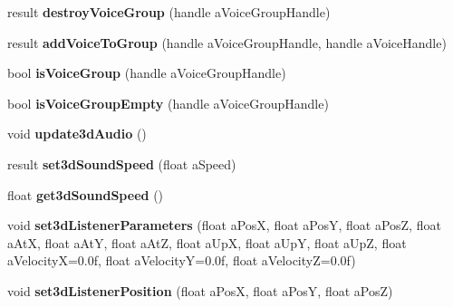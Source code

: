 \begin{DoxyCompactItemize}
\item 
\mbox{\label{class_so_loud_1_1_soloud_aae50bbfa2f6bd1e598ef6b5b15636e9c}} 
result {\bfseries destroy\+Voice\+Group} (handle a\+Voice\+Group\+Handle)
\item 
\mbox{\label{class_so_loud_1_1_soloud_a9db61d9832918e34b27fc8f07e03181a}} 
result {\bfseries add\+Voice\+To\+Group} (handle a\+Voice\+Group\+Handle, handle a\+Voice\+Handle)
\item 
\mbox{\label{class_so_loud_1_1_soloud_a7e0cce56db2108f4401244a7f7b4b209}} 
bool {\bfseries is\+Voice\+Group} (handle a\+Voice\+Group\+Handle)
\item 
\mbox{\label{class_so_loud_1_1_soloud_af7805b0b20fc49629a9e45eda96ae445}} 
bool {\bfseries is\+Voice\+Group\+Empty} (handle a\+Voice\+Group\+Handle)
\item 
\mbox{\label{class_so_loud_1_1_soloud_a21eb58ebde3955245ac69e3aa5b5f145}} 
void {\bfseries update3d\+Audio} ()
\item 
\mbox{\label{class_so_loud_1_1_soloud_a0e819643ca149ca31718322cdde5bf00}} 
result {\bfseries set3d\+Sound\+Speed} (float a\+Speed)
\item 
\mbox{\label{class_so_loud_1_1_soloud_a49769664474746f5eada52300e46f2b8}} 
float {\bfseries get3d\+Sound\+Speed} ()
\item 
\mbox{\label{class_so_loud_1_1_soloud_a3f2bfc85ad456ba9987fdb6d2ea6497b}} 
void {\bfseries set3d\+Listener\+Parameters} (float a\+PosX, float a\+PosY, float a\+PosZ, float a\+AtX, float a\+AtY, float a\+AtZ, float a\+UpX, float a\+UpY, float a\+UpZ, float a\+VelocityX=0.\+0f, float a\+Velocity\+Y=0.\+0f, float a\+Velocity\+Z=0.\+0f)
\item 
\mbox{\label{class_so_loud_1_1_soloud_a2a26c92f8ba7b283da730d038ca07ab5}} 
void {\bfseries set3d\+Listener\+Position} (float a\+PosX, float a\+PosY, float a\+PosZ)
\item 
\mbox{\label{class_so_loud_1_1_soloud_aeb3d87e784043242e8a36003a1b5a1d5}} 

\end{DoxyCompactItemize}
